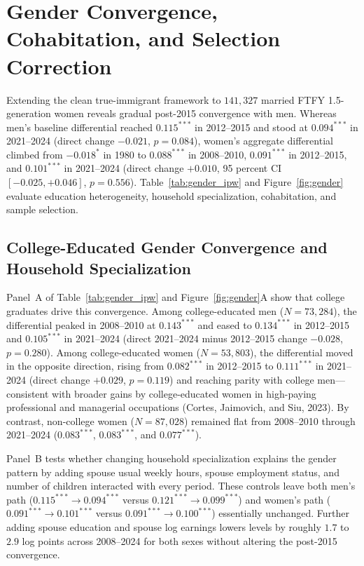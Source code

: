 \documentclass[11pt]{article}
\begin{document}
\section{Gender Convergence, Cohabitation, and Selection Correction}
Extending the clean true-immigrant framework to $141{,}327$ married FTFY 1.5-generation women reveals gradual post-2015 convergence with men. Whereas men's baseline differential reached $0.115^{***}$ in 2012--2015 and stood at $0.094^{***}$ in 2021--2024 (direct change $-0.021$, $p = 0.084$), women's aggregate differential climbed from $-0.018^{*}$ in 1980 to $0.088^{***}$ in 2008--2010, $0.091^{***}$ in 2012--2015, and $0.101^{***}$ in 2021--2024 (direct change $+0.010$, 95 percent CI $[-0.025, +0.046]$, $p = 0.556$). Table~\ref{tab:gender_ipw} and Figure~\ref{fig:gender} evaluate education heterogeneity, household specialization, cohabitation, and sample selection.



\subsection{College-Educated Gender Convergence and Household Specialization}
Panel~A of Table~\ref{tab:gender_ipw} and Figure~\ref{fig:gender}A show that college graduates drive this convergence. Among college-educated men ($N = 73{,}284$), the differential peaked in 2008--2010 at $0.143^{***}$ and eased to $0.134^{***}$ in 2012--2015 and $0.105^{***}$ in 2021--2024 (direct 2021--2024 minus 2012--2015 change $-0.028$, $p = 0.280$). Among college-educated women ($N = 53{,}803$), the differential moved in the opposite direction, rising from $0.082^{***}$ in 2012--2015 to $0.111^{***}$ in 2021--2024 (direct change $+0.029$, $p = 0.119$) and reaching parity with college men---consistent with broader gains by college-educated women in high-paying professional and managerial occupations (Cortes, Jaimovich, and Siu, 2023). By contrast, non-college women ($N = 87{,}028$) remained flat from 2008--2010 through 2021--2024 ($0.083^{***}$, $0.083^{***}$, and $0.077^{***}$).

Panel~B tests whether changing household specialization explains the gender pattern by adding spouse usual weekly hours, spouse employment status, and number of children interacted with every period. These controls leave both men's path ($0.115^{***}\to 0.094^{***}$ versus $0.121^{***}\to 0.099^{***}$) and women's path ($0.091^{***}\to 0.101^{***}$ versus $0.091^{***}\to 0.100^{***}$) essentially unchanged. Further adding spouse education and spouse log earnings lowers levels by roughly $1.7$ to $2.9$ log points across 2008--2024 for both sexes without altering the post-2015 convergence.
\end{document}
